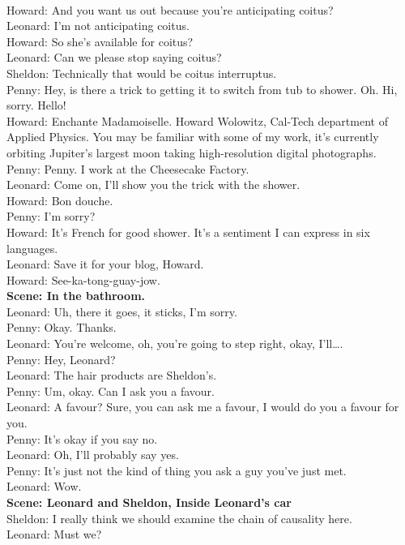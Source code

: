 \documentclass[a4paper,12pt]{article}
\begin{document}
\topic{}%
{\\Howard: And you want us out because you’re anticipating coitus?
\\Leonard: I’m not anticipating coitus.
\\Howard: So she’s available for coitus?
\\Leonard: Can we please stop saying coitus?
\\Sheldon: Technically that would be coitus interruptus.
\\Penny: Hey, is there a trick to getting it to switch from tub to shower. Oh. Hi, sorry. Hello!
\\Howard: Enchante Madamoiselle. Howard Wolowitz, Cal-Tech department of Applied Physics. You may be familiar with some of my work, it’s currently orbiting Jupiter’s largest moon taking high-resolution digital photographs.
\\Penny: Penny. I work at the Cheesecake Factory.
\\Leonard: Come on, I’ll show you the trick with the shower.
\\Howard: Bon douche.
\\Penny: I’m sorry?
\\Howard: It’s French for good shower. It’s a sentiment I can express in six languages.
\\Leonard: Save it for your blog, Howard.
\\Howard: See-ka-tong-guay-jow.
\\{\Large \textbf{Scene: In the bathroom.
}}\\Leonard: Uh, there it goes, it sticks, I’m sorry.
\\Penny: Okay. Thanks.
\\Leonard: You’re welcome, oh, you’re going to step right, okay, I’ll….
\\Penny: Hey, Leonard?
\\Leonard: The hair products are Sheldon’s.
\\Penny: Um, okay. Can I ask you a favour.
\\Leonard: A favour? Sure, you can ask me a favour, I would do you a favour for you.
\\Penny: It’s okay if you say no.
\\Leonard: Oh, I’ll probably say yes.
\\Penny: It’s just not the kind of thing you ask a guy you’ve just met.
\\Leonard: Wow.
\\{\Large \textbf{Scene: Leonard and Sheldon, Inside Leonard’s car
}}\\Sheldon: I really think we should examine the chain of causality here.
\\Leonard: Must we?
}%
\end{document}
